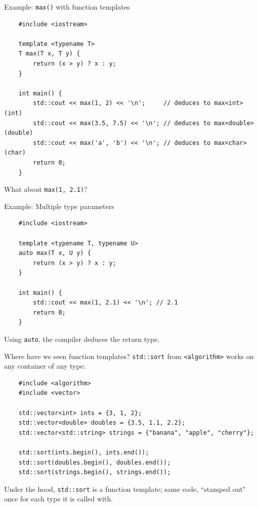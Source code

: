 \begin{frame}[fragile]{Example: \texttt{max()} with function templates}
  \begin{verbatim}
    #include <iostream>

    template <typename T>
    T max(T x, T y) {
        return (x > y) ? x : y;
    }

    int main() {
        std::cout << max(1, 2) << '\n';     // deduces to max<int>(int)
        std::cout << max(3.5, 7.5) << '\n'; // deduces to max<double>(double)
        std::cout << max('a', 'b') << '\n'; // deduces to max<char>(char)
        return 0;
    }
  \end{verbatim}

  What about \texttt{max(1, 2.1)}?
\end{frame}

\begin{frame}[fragile]{Example: Multiple type parameters}
  \begin{verbatim}
    #include <iostream>

    template <typename T, typename U>
    auto max(T x, U y) {
        return (x > y) ? x : y;
    }

    int main() {
        std::cout << max(1, 2.1) << '\n'; // 2.1
        return 0;
    }
  \end{verbatim}

  Using \texttt{auto}, the compiler deduces the return type.
\end{frame}

\begin{frame}[fragile]{Where have we seen function templates?}
  \texttt{std::sort} from \texttt{<algorithm>} works on any container of any type:
  \begin{verbatim}
    #include <algorithm>
    #include <vector>

    std::vector<int> ints = {3, 1, 2};
    std::vector<double> doubles = {3.5, 1.1, 2.2};
    std::vector<std::string> strings = {"banana", "apple", "cherry"};

    std::sort(ints.begin(), ints.end());
    std::sort(doubles.begin(), doubles.end());
    std::sort(strings.begin(), strings.end());
  \end{verbatim}
  Under the hood, \texttt{std::sort} is a function template; same code,
  ``stamped out" once for each type it is called with.
\end{frame}

